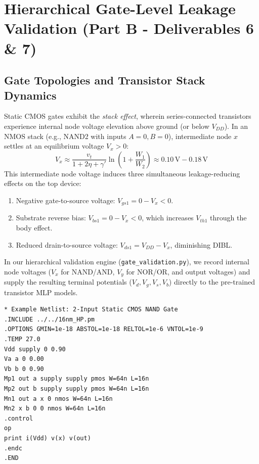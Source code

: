 \documentclass[11pt,a4paper]{article}
\begin{document}
\section{Hierarchical Gate-Level Leakage Validation (Part B - Deliverables 6 \& 7)}
\subsection{Gate Topologies and Transistor Stack Dynamics}
Static CMOS gates exhibit the \textit{stack effect}, wherein series-connected transistors experience internal node voltage elevation above ground (or below $V_{DD}$). In an NMOS stack (e.g., NAND2 with inputs $A=0, B=0$), intermediate node $x$ settles at an equilibrium voltage $V_x > 0$:
\begin{equation}
    V_x \approx \frac{v_t}{1 + 2\eta + \gamma'} \ln\left(1 + \frac{W_1}{W_2}\right) \approx 0.10\,\text{V} - 0.18\,\text{V}
\end{equation}
This intermediate node voltage induces three simultaneous leakage-reducing effects on the top device:
\begin{enumerate}
    \item Negative gate-to-source voltage: $V_{gs1} = 0 - V_x < 0$.
    \item Substrate reverse bias: $V_{bs1} = 0 - V_x < 0$, which increases $V_{th1}$ through the body effect.
    \item Reduced drain-to-source voltage: $V_{ds1} = V_{DD} - V_x$, diminishing DIBL.
\end{enumerate}

In our hierarchical validation engine (\texttt{gate\_validation.py}), we record internal node voltages ($V_x$ for NAND/AND, $V_y$ for NOR/OR, and output voltages) and supply the resulting terminal potentials ($V_d, V_g, V_s, V_b$) directly to the pre-trained transistor MLP models.

\begin{lstlisting}[caption={Example Complete Gate Netlist (Deliverable 2: \texttt{netlists/gates/nand2.sp})},label={lst:nand2}]
* Example Netlist: 2-Input Static CMOS NAND Gate
.INCLUDE ../../16nm_HP.pm
.OPTIONS GMIN=1e-18 ABSTOL=1e-18 RELTOL=1e-6 VNTOL=1e-9
.TEMP 27.0
Vdd supply 0 0.90
Va a 0 0.00
Vb b 0 0.90
Mp1 out a supply supply pmos W=64n L=16n
Mp2 out b supply supply pmos W=64n L=16n
Mn1 out a x 0 nmos W=64n L=16n
Mn2 x b 0 0 nmos W=64n L=16n
.control
op
print i(Vdd) v(x) v(out)
.endc
.END
\end{lstlisting}
\end{document}
